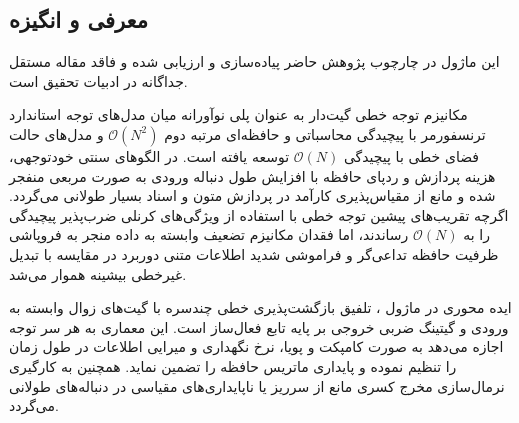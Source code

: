 \subsection{معرفی و انگیزه}
این ماژول در چارچوب پژوهش حاضر پیاده‌سازی و ارزیابی شده و فاقد مقاله مستقل جداگانه در ادبیات تحقیق است.

مکانیزم توجه خطی گیت‌دار  به عنوان پلی نوآورانه میان مدل‌های توجه استاندارد ترنسفورمر با پیچیدگی محاسباتی و حافظه‌ای مرتبه دوم $\mathcal{O}(N^2)$ و مدل‌های حالت فضای خطی  با پیچیدگی $\mathcal{O}(N)$ توسعه یافته است. در الگوهای سنتی خودتوجهی، هزینه پردازش و ردپای حافظه با افزایش طول دنباله ورودی به صورت مربعی منفجر شده و مانع از مقیاس‌پذیری کارآمد در پردازش متون و اسناد بسیار طولانی می‌گردد. اگرچه تقریب‌های پیشین توجه خطی با استفاده از ویژگی‌های کرنلی ضرب‌پذیر پیچیدگی را به $\mathcal{O}(N)$ رساندند، اما فقدان مکانیزم تضعیف وابسته به داده منجر به فروپاشی ظرفیت حافظه تداعی‌گر و فراموشی شدید اطلاعات متنی دوربرد در مقایسه با تبدیل غیرخطی بیشینه هموار  می‌شد.

ایده محوری در ماژول ، تلفیق بازگشت‌پذیری خطی چندسره با گیت‌های زوال وابسته به ورودی  و گیتینگ ضربی خروجی بر پایه تابع فعال‌ساز  است. این معماری به هر سر توجه اجازه می‌دهد به صورت کامپکت و پویا، نرخ نگهداری و میرایی اطلاعات در طول زمان را تنظیم نموده و پایداری ماتریس حافظه را تضمین نماید. همچنین به کارگیری نرمال‌سازی مخرج کسری مانع از سرریز یا ناپایداری‌های مقیاسی در دنباله‌های طولانی می‌گردد.
